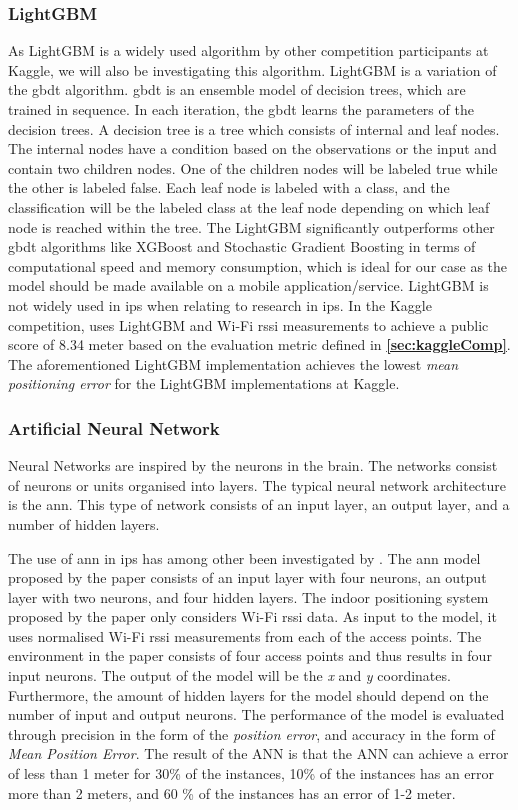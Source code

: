 \subsubsection{LightGBM}
As LightGBM is a widely used algorithm by other competition participants at Kaggle, we will also be investigating this algorithm.
LightGBM is a variation of the \gls{gbdt} algorithm. \gls{gbdt} is an ensemble model of decision trees, which are trained in sequence. In each iteration, the \gls{gbdt} learns the parameters of the decision trees. A decision tree is a tree which consists of internal and leaf nodes. The internal nodes have a condition based on the observations or the input and contain two children nodes. One of the children nodes will be labeled true while the other is labeled false. Each leaf node is labeled with a class, and the classification will be the labeled class at the leaf node depending on which leaf node is reached within the tree\cite{AIBook}.
The LightGBM significantly outperforms other \gls{gbdt} algorithms like XGBoost and Stochastic Gradient Boosting in terms of computational speed and memory consumption, which is ideal for our case as the model should be made available on a mobile application/service. \cite{lightgbm} LightGBM is not widely used in \gls{ips} when relating to research in \gls{ips}. In the Kaggle competition, \cite{lgbmKaggle01} uses LightGBM and Wi-Fi \gls{rssi} measurements to achieve a public score of 8.34 meter based on the evaluation metric defined in \textbf{\autoref{sec:kaggleComp}}. The aforementioned LightGBM implementation achieves the lowest \textit{mean positioning error} for the LightGBM implementations at Kaggle.

\subsubsection{Artificial Neural Network}
Neural Networks are inspired by the neurons in the brain. The networks consist of neurons or units organised into layers. The typical neural network architecture is the \gls{ann}. This type of network consists of an input layer, an output layer, and a number of hidden layers\cite{AIBook}. 

The use of \gls{ann} in \gls{ips} has among other been investigated by \cite{ANN01}. The \gls{ann} model proposed by the paper consists of an input layer with four neurons, an output layer with two neurons, and four hidden layers. The indoor positioning system proposed by the paper only considers Wi-Fi \gls{rssi} data. As input to the model, it uses normalised Wi-Fi \gls{rssi} measurements from each of the access points. The environment in the paper consists of four access points and thus results in four input neurons. The output of the model will be the \textit{x} and \textit{y} coordinates. Furthermore, the amount of hidden layers for the model should depend on the number of input and output neurons. The performance of the model is evaluated through precision in the form of the \textit{position error}, and accuracy in the form of \textit{Mean Position Error}. The result of the ANN is that the ANN can achieve a error of less than 1 meter for 30\% of the instances, 10\% of the instances has an error more than 2 meters, and 60 \% of the instances has an error of 1-2 meter. 

